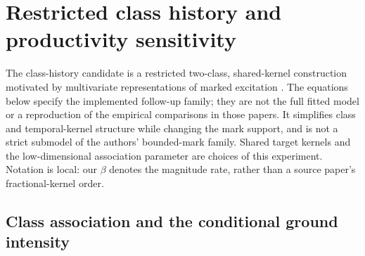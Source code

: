 \section{Restricted class history and productivity sensitivity}
\label{a2:models}

The class-history candidate is a restricted two-class, shared-kernel
construction motivated by multivariate representations of marked excitation
\citep{DavisBaeumerWang2026,DavisKresinBaeumerWang2026}.
The equations below specify the implemented follow-up family; they are not
the full fitted model or a reproduction of the empirical comparisons in those
papers. It simplifies class and temporal-kernel structure while changing the
mark support, and is not a strict submodel of the authors' bounded-mark
family. Shared target kernels and the low-dimensional association parameter
are choices of this experiment. Notation is local: our \(\beta\) denotes the
magnitude rate, rather than a source paper's fractional-kernel order.

\subsection{Class association and the conditional ground intensity}

